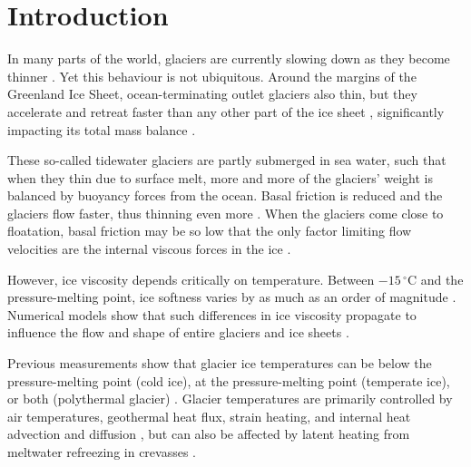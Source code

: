 \documentclass[utf8]{article}
\begin{document}
\section{Introduction}

    In many parts of the world, glaciers are currently slowing down as they
    become thinner \citep{Heid.Kaab.2012, Dehecq.etal.2018}. Yet this behaviour
    is not ubiquitous. Around the margins of
    the Greenland Ice Sheet, ocean-terminating outlet glaciers also thin, but
    they accelerate and retreat faster than any other part of the ice sheet
    \citep[e.g.,][]{Krabill.etal.2000, Rignot.Kanagaratnam.2006,
    Pritchard.etal.2009, Hill.etal.2017}, significantly impacting its total
    mass balance \citep[e.g.,][]{Enderlin.etal.2014, Khan.etal.2015,
    McMillan.etal.2016}.

    These so-called tidewater glaciers are partly submerged in sea water, such
    that when they thin due to surface melt, more and more of the glaciers'
    weight is balanced by buoyancy forces from the ocean. Basal friction is
    reduced and the glaciers flow faster, thus thinning even more
    \citep{Meier.Post.1987}. When the
    glaciers come close to floatation, basal friction may be so low that the
    only factor limiting flow velocities are the internal viscous forces in
    the ice \citep{Shapero.etal.2016, Seddik.etal.2019}.

    However, ice viscosity depends critically on temperature. Between
    $-15\,^\circ$C and the pressure-melting point, ice softness varies by as
    much as an order of magnitude \citep[p.~72]{Cuffey.Paterson.2010}.
    Numerical models show that such differences
    in ice viscosity propagate to influence the flow and shape of entire
    glaciers and ice sheets \citep[Figs.~2 and~7]{Seguinot.etal.2016}.

    Previous measurements show that glacier ice temperatures can be below
    the pressure-melting point (cold ice), at the pressure-melting point
    (temperate ice), or both (polythermal glacier)
    \citep[p.~399]{Ahlmann.1935, Cuffey.Paterson.2010}. Glacier temperatures
    are primarily controlled by air temperatures, geothermal heat flux, strain
    heating, and internal heat advection and diffusion \citep{Q-Robin.1955},
    but can also be affected by latent heating from meltwater refreezing in
    crevasses \citep{Phillips.etal.2010, Phillips.etal.2013, Luthi.etal.2015}.
\end{document}
